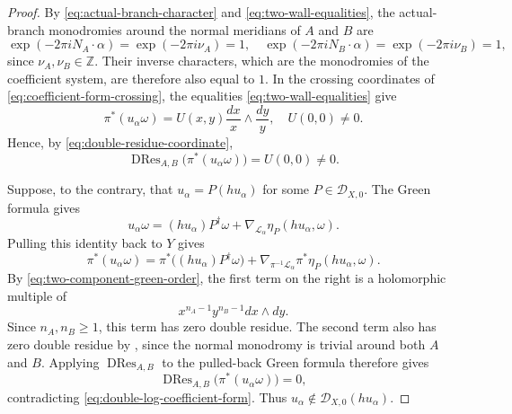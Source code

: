 \documentclass[12pt]{amsart}
\numberwithin{equation}{section}
\theoremstyle{plain}
\theoremstyle{definition}
\theoremstyle{remark}
\theoremstyle{definition}
\DeclareMathOperator{\DRes}{DRes}
\newcommand{\Z}{\mathbb Z}
\newcommand{\D}{\mathscr D}
\newcommand{\Lcal}{\mathscr L}
\begin{document}
\begin{proof}
By \eqref{eq:actual-branch-character} and \eqref{eq:two-wall-equalities}, the actual-branch monodromies around the normal meridians of $A$ and $B$ are
\begin{equation*}
\exp(-2\pi iN_A\cdot\alpha)=\exp(-2\pi i\nu_A)=1,\quad \exp(-2\pi iN_B\cdot\alpha)=\exp(-2\pi i\nu_B)=1,
\end{equation*}
since $\nu_A,\nu_B\in\Z$. Their inverse characters, which are the monodromies of the coefficient system, are therefore also equal to $1$. In the crossing coordinates of \eqref{eq:coefficient-form-crossing}, the equalities \eqref{eq:two-wall-equalities} give
\begin{equation*}
\pi^*(u_\alpha\omega)=U(x,y)\frac{dx}{x}\wedge\frac{dy}{y},\quad U(0,0)\neq0.
\end{equation*}
Hence, by \eqref{eq:double-residue-coordinate},
\begin{equation}\label{eq:double-log-coefficient-form}
\DRes_{A,B}\bigl(\pi^*(u_\alpha\omega)\bigr)=U(0,0)\neq0.
\end{equation}

Suppose, to the contrary, that $u_\alpha=P(hu_\alpha)$ for some $P\in\D_{X,0}$. The Green formula gives
\begin{equation*}
u_\alpha\omega=(hu_\alpha)P^\dagger\omega+\nabla_{\Lcal_\alpha}\eta_P(hu_\alpha,\omega).
\end{equation*}
Pulling this identity back to $Y$ gives
\begin{equation*}
\pi^*(u_\alpha\omega)=\pi^*\bigl((hu_\alpha)P^\dagger\omega\bigr)+\nabla_{\pi^{-1}\Lcal_\alpha}\pi^*\eta_P(hu_\alpha,\omega).
\end{equation*}
By \eqref{eq:two-component-green-order}, the first term on the right is a holomorphic multiple of
\begin{equation*}
x^{n_A-1}y^{n_B-1}dx\wedge dy.
\end{equation*}
Since $n_A,n_B\geq1$, this term has zero double residue. The second term also has zero double residue by , since the normal monodromy is trivial around both $A$ and $B$. Applying $\DRes_{A,B}$ to the pulled-back Green formula therefore gives
\begin{equation*}
\DRes_{A,B}\bigl(\pi^*(u_\alpha\omega)\bigr)=0,
\end{equation*}
contradicting \eqref{eq:double-log-coefficient-form}. Thus $u_\alpha\notin\D_{X,0}(hu_\alpha)$.
\end{proof}
\end{document}
